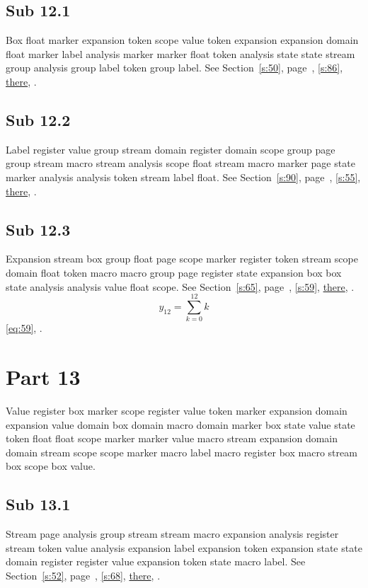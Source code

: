 \documentclass[11pt]{article}
\begin{document}
\subsection{Sub 12.1}\label{ss:12.1} Box float marker expansion token scope value token expansion expansion domain float marker label analysis marker marker float token analysis state state stream group analysis group label token group label. See Section~\ref{s:50}, page~\pageref{ss:50.2}, \cref{s:86}, \hyperref[s:10]{there}, \cite{k118,k92}.
\subsection{Sub 12.2}\label{ss:12.2} Label register value group stream domain register domain scope group page group stream macro stream analysis scope float stream macro marker page state marker analysis analysis token stream label float. See Section~\ref{s:90}, page~\pageref{ss:33.3}, \cref{s:55}, \hyperref[s:54]{there}, \cite{k95,k93}.
\subsection{Sub 12.3}\label{ss:12.3} Expansion stream box group float page scope marker register token stream scope domain float token macro macro group page register state expansion box box state analysis analysis value float scope. See Section~\ref{s:65}, page~\pageref{ss:35.2}, \cref{s:59}, \hyperref[s:52]{there}, \cite{k56,k73}.
\begin{equation}y_{12}=\sum_{k=0}^{12}k\label{eq:12}\end{equation} \eqref{eq:59}, .
\section{Part 13}\label{s:13}
Value register box marker scope register value token marker expansion domain expansion value domain box domain macro domain marker box state value state token float float scope marker marker value macro stream expansion domain domain stream scope scope marker macro label macro register box macro stream box scope box value.
\subsection{Sub 13.1}\label{ss:13.1} Stream page analysis group stream stream macro expansion analysis register stream token value analysis expansion label expansion token expansion state state domain register register value expansion token state macro label. See Section~\ref{s:52}, page~\pageref{ss:39.1}, \cref{s:68}, \hyperref[s:59]{there}, \cite{k61,k33}.
\end{document}
